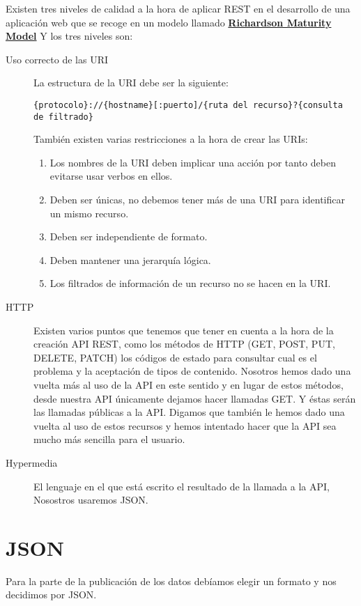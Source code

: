 Existen tres niveles de calidad a la hora de aplicar REST en el desarrollo de una aplicación web que se recoge en un modelo llamado 
\href{http://martinfowler.com/articles/richardsonMaturityModel.html}{\textbf{Richardson Maturity Model}} Y los tres niveles son:
\begin{description}
\item[Uso correcto de las URI]
La estructura de la URI debe ser la siguiente:

\hspace*{-10mm}
\begin{minipage}{12cm}
\begin{lstlisting}
{protocolo}://{hostname}[:puerto]/{ruta del recurso}?{consulta de filtrado}
\end{lstlisting}
\end{minipage}

También existen varias restricciones a la hora de crear las URIs:

\begin{enumerate}
\item Los nombres de la URI deben implicar una acción por tanto deben evitarse usar verbos en ellos.
\item Deben ser únicas, no debemos tener más de una URI para identificar un mismo recurso.
\item Deben ser independiente de formato.
\item Deben mantener una jerarquía lógica.
\item Los filtrados de información de un recurso no se hacen en la URI.
\end{enumerate}

\item[HTTP]
Existen varios puntos que tenemos que tener en cuenta a la hora de la creación API REST, como los métodos de HTTP (GET, POST, PUT, DELETE, PATCH) los códigos de estado para consultar cual es el problema y la aceptación de tipos de contenido.
Nosotros hemos dado una vuelta más al uso de la API en este sentido y en lugar de estos métodos, desde nuestra API únicamente dejamos hacer llamadas GET. Y éstas serán las llamadas públicas a la API. Digamos que también le hemos dado una vuelta al uso de estos recursos y hemos intentado hacer que la API sea mucho más sencilla para el usuario.
\item[Hypermedia]
El lenguaje en el que está escrito el resultado de la llamada a la API, Nosostros usaremos JSON.
\end{description}

\section{JSON}
Para la parte de la publicación de los datos debíamos elegir un formato y nos decidimos por JSON. 

